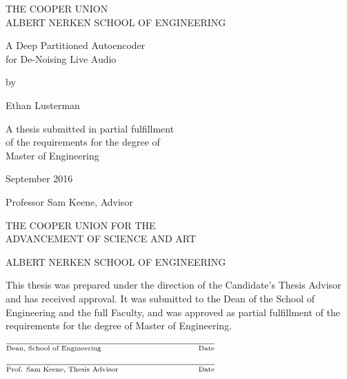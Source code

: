 \documentclass[12pt]{article}
\newcommand\tline[2]{$\underset{\text{#1}}{\text{\underline{\hspace{#2}}}}$}
\begin{document}
\thispagestyle{empty}
\begin{center}
\Large

THE COOPER UNION\\
ALBERT NERKEN SCHOOL OF ENGINEERING

\vspace{1in}

{
\LARGE
A Deep Partitioned Autoencoder \\for De-Noising Live Audio

}

\vspace{1in}

by

Ethan Lusterman

\vspace*{\fill}

A thesis submitted in partial fulfillment\\
of the requirements for the degree of\\
Master of Engineering

\vspace{1in}

September 2016

\vspace{1in}

Professor Sam Keene, Advisor

\end{center}

\newpage
\thispagestyle{empty}
\begin{center}
\Large
THE COOPER UNION FOR THE \\ADVANCEMENT OF SCIENCE AND ART

\vspace{0.5in}

ALBERT NERKEN SCHOOL OF ENGINEERING

\vspace{1in}

\justify

This thesis was prepared under the direction of the Candidate's Thesis Advisor
and has received approval. It was submitted to the Dean of the School of
Engineering and the full Faculty, and was approved as partial fulfillment of
the requirements for the degree of Master of Engineering.

\raggedright

\vspace{1in}

\hfill \tline{Dean, School of Engineering \hfill Date}{3in}

\vspace{1in}

\tline{Prof. Sam Keene, Thesis Advisor \hfill Date}{3in}


\end{center}
\end{document}
